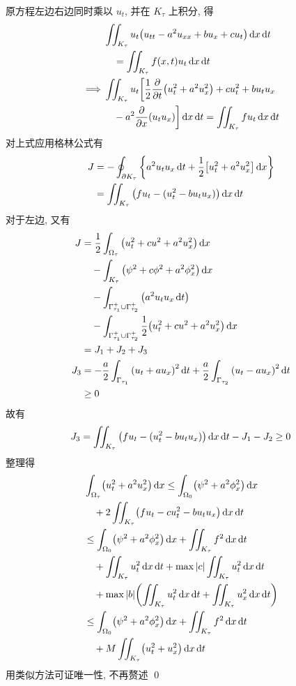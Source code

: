 \begin{solution}
原方程左边右边同时乘以 $u_t$, 并在 $K_\tau$ 上积分, 得
\begin{align*}
& \iint_{K_\tau} u_t \mclosure{
    u_{tt} - a^2 u_{xx} + b u_x + c u_t
} \diff x \diff t \\
&\quad= \iint_{K_\tau} f(x, t) u_t \diff x \diff t \\
\implies & \iint_{K_\tau} u_t \biggl[
    \frac12 \fracpartials{t} \mclosure{u_t^2 + a^2 u_x^2}
    + c u_t^2 + b u_t u_x \\
&\quad- a^2 \fracpartials{x} \mclosure{u_t u_x}
\biggr] \diff x \diff t = \iint_{K_\tau} f u_t \diff x \diff t
\end{align*}
对上式应用格林公式有
\begin{align*}
J &= -\oint_{\partial K_\tau} {\left\{ {
    a^2 u_t u_x \operatorname{d\!} t + \frac12 {\left[ { u_t^2 + a^2 u_x^2 } \right]} \operatorname{d\!} x
} \right\}} \\
&= \iint_{K_\tau} {\left( { f u_t - (u_t^2 - b u_t u_x) } \right)} \operatorname{d\!} x \operatorname{d\!} t
\end{align*}
对于左边, 又有
\begin{align*}
J &= \frac12 \int_{\Omega_\tau} {\left( {u_t^2 + cu^2 + a^2 u_x^2} \right)} \operatorname{d\!} x \\
&\quad- \int_{K_\tau} {\left( {\psi^2 + c\phi^2 + a^2 \phi_x^2} \right)} \operatorname{d\!} x \\
&\quad- \int_{\Gamma_{\tau_1}^{+}\cup\Gamma_{\tau_2}^{+}} {\left( {
    a^2 u_t u_x \operatorname{d\!} t
} \right)} \\
&\quad- \int_{\Gamma_{\tau_1}^{+}\cup\Gamma_{\tau_2}^{+}} \frac12 {\left( {
    u_t^2 + c u^2 + a^2 u_x^2
} \right)} \operatorname{d\!} x \\
&= J_1 + J_2 + J_3 \\
J_3 &= -\frac{a}{2} \int_{\Gamma_{\tau_1}} {\left( {
    u_t + a u_x
} \right)}^2 \operatorname{d\!} t + \frac{a}{2} \int_{\Gamma_{\tau_2}} {\left( {
    u_t - a u_x
} \right)}^2 \operatorname{d\!} t \\
&\geq 0
\end{align*}
故有
\[
J_3 = \iint_{K_\tau} {\left( {
    f u_t - (u_t^2 - b u_t u_x)
} \right)} \operatorname{d\!} x \operatorname{d\!} t - J_1 - J_2 \geq 0
\]
整理得
\begin{align*}
& \int_{\Omega_\tau} \bigl( u_t^2 + a^2 u_x^2 \bigr) \diff x
    \leq \int_{\Omega_0} \bigl( \psi^2 + a^2 \phi_x^2 \bigr) \diff x \\
&\quad+ 2 \iint_{K_\tau} \bigl( f u_t - c u_t^2 - b u_t u_x \bigr) \diff x \diff t \\
&\leq \int_{\Omega_0} \bigl( \psi^2 + a^2 \phi_x^2 \bigr) \diff x
    + \iint_{K_\tau} f^2\diff x\diff t \\
&\quad+ \iint_{K_\tau} u_t^2\diff x\diff t
    + \max\abs{c} \iint_{K_\tau} u_t^2 \diff x \diff t \\
&\quad+ \max\abs{b} \biggl(
    \iint_{K_\tau} u_t^2 \diff x \diff t
    + \iint_{K_\tau} u_x^2 \diff x \diff t
\biggr) \\
&\leq \int_{\Omega_0} \bigl( \psi^2 + a^2 \phi_x^2 \bigr) \diff x
    +\iint_{K_\tau} f^2\diff x\diff t \\
&\quad+ M \iint_{K_\tau} \bigl( u_t^2 + u_x^2 \bigr) \diff x \diff t
\end{align*}
用类似方法可证唯一性, 不再赘述
\qed
\end{solution}
